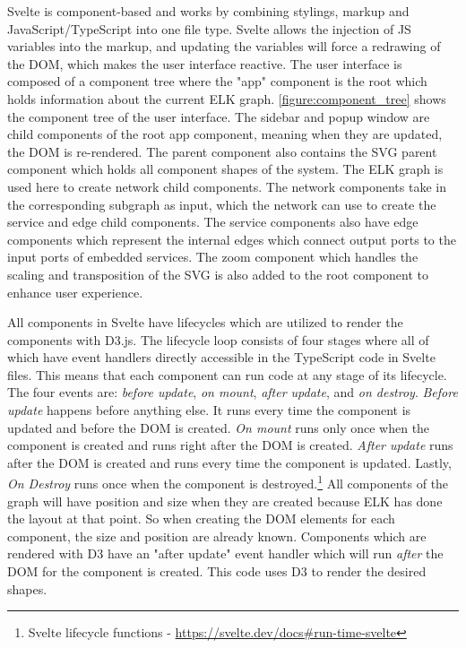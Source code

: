 Svelte is component-based and works by combining stylings, markup and JavaScript/TypeScript into one file type. Svelte allows the injection of JS variables into the markup, and updating the variables will force a redrawing of the DOM, which makes the user interface reactive.
The user interface is composed of a component tree where the "app" component is the root which holds information about the current ELK graph. \cref{figure:component_tree} shows the component tree of the user interface. The sidebar and popup window are child components of the root app component, meaning when they are updated, the DOM is re-rendered. 
The parent component also contains the SVG parent component which holds all component shapes of the system.
The ELK graph is used here to create network child components. The network components take in the corresponding subgraph as input, which the network can use to create the service and edge child components.
The service components also have edge components which represent the internal edges which connect output ports to the input ports of embedded services.
The zoom component which handles the scaling and transposition of the SVG is also added to the root component to enhance user experience.

All components in Svelte have lifecycles which are utilized to render the components with D3.js.
The lifecycle loop consists of four stages where all of which have event handlers directly accessible in the TypeScript code in Svelte files. This means that each component can run code at any stage of its lifecycle.
The four events are: \textit{before update}, \textit{on mount}, \textit{after update}, and \textit{on destroy}.
\textit{Before update} happens before anything else. It runs every time the component is updated and before the DOM is created.
\textit{On mount} runs only once when the component is created and runs right after the DOM is created. 
\textit{After update} runs after the DOM is created and runs every time the component is updated.
Lastly, \textit{On Destroy} runs once when the component is destroyed.\footnote{Svelte lifecycle functions - \url{https://svelte.dev/docs\#run-time-svelte}}
All components of the graph will have position and size when they are created because ELK has done the layout at that point.
So when creating the DOM elements for each component, the size and position are already known.
Components which are rendered with D3 have an "after update" event handler which will run \textit{after} the DOM for the component is created. This code uses D3 to render the desired shapes.

